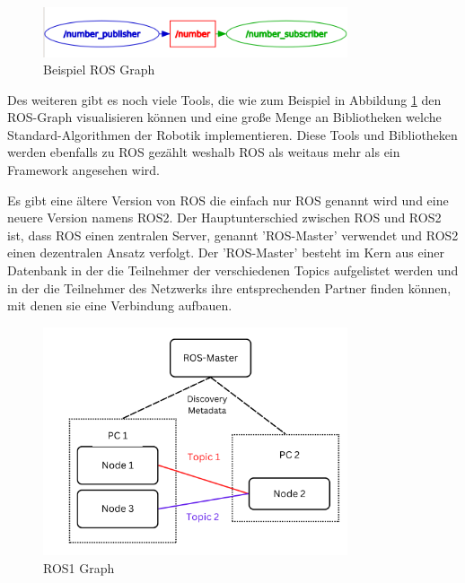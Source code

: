 \begin{flushleft}
\begin{description}
        \begin{figure}[h!]
            \centering
            \includegraphics[width=0.8\textwidth]{imgs/Grundbegriffe/graph_2_nodes_with_topic.png}
            \caption{Beispiel ROS Graph}
            \label{fig:ros_graph}%
        \end{figure}

        Des weiteren gibt es noch viele Tools, die wie zum Beispiel in Abbildung \ref{fig:ros_graph} den ROS-Graph visualisieren können und eine große Menge an Bibliotheken welche Standard-Algorithmen der Robotik implementieren.
        Diese Tools und Bibliotheken werden ebenfalls zu ROS gezählt weshalb ROS als weitaus mehr als ein Framework angesehen wird.

        Es gibt eine ältere Version von ROS die einfach nur ROS genannt wird und eine neuere Version namens ROS2.
        Der Hauptunterschied zwischen ROS und ROS2 ist, dass ROS einen zentralen Server, genannt 'ROS-Master' verwendet und ROS2 einen dezentralen Ansatz verfolgt.
        Der 'ROS-Master' besteht im Kern aus einer Datenbank in der die Teilnehmer der verschiedenen Topics aufgelistet werden und in der die Teilnehmer des Netzwerks ihre entsprechenden Partner finden können, mit denen sie eine Verbindung aufbauen.
        
        \begin{figure}[h!]
            \centering
            \includegraphics[width=0.8\textwidth]{imgs/ROS1_concept_graph.png}
            \caption{ROS1 Graph}
            \label{fig:ros1_concept_graph}%
        \end{figure}


\end{description}
\end{flushleft}
